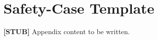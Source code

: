 \chapter{Safety-Case Template}
\label{appg-safety-case-template}

\textbf{[STUB]} Appendix content to be written.
